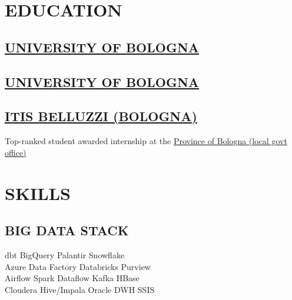 \documentclass[]{deedy-resume-cv}
\begin{document}
\hfill
\begin{minipage}[t]{0.35\textwidth}

\section{EDUCATION}

\subsection{\href{https://www.unibo.it/}{UNIVERSITY OF BOLOGNA}}

\sectionsep
\subsection{\href{https://www.unibo.it/}{UNIVERSITY OF BOLOGNA}}

\sectionsep
\subsection{\href{https://www.belluzzifioravanti.it/}{ITIS BELLUZZI (BOLOGNA)}}
Top-ranked student awarded internship at the \href{https://www.cittametropolitana.bo.it/}{Province of Bologna (local govt office)}

\section{SKILLS}

\subsection{BIG DATA STACK}
dbt \textbullet{} BigQuery \textbullet{} Palantir \textbullet{} Snowflake \\
Azure Data Factory \textbullet{} Databricks \textbullet{} Purview \\
Airflow \textbullet{} Spark \textbullet{} Dataflow \textbullet{} Kafka \textbullet{} HBase \\
Cloudera Hive/Impala \textbullet{} Oracle DWH \textbullet{} SSIS


\end{minipage}
\end{document}
